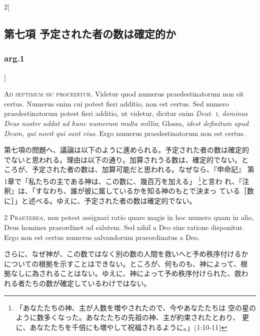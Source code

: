 \documentclass[paper=a4paper,fontsize=10pt,jafontsize=9pt,titlepage]{jlreq}
\begin{document}
\begin{paracol}{2}[\subsection{第七項 予定された者の数は確定的か}\subsubsection{arg.1}]

{\Huge A}{\scshape d septimum sic proceditur}. Videtur quod
numerus praedestinatorum non sit certus. Numerus enim cui potest fieri
additio, non est certus. Sed numero praedestinatorum potest fieri
additio, ut videtur, dicitur enim {\itshape Deut}.~{\scshape i}, {\itshape dominus Deus noster addat ad
hunc numerum multa millia}; Glossa, {\itshape idest definitum apud Deum, qui novit
qui sunt eius}. Ergo numerus praedestinatorum non est certus.


\switchcolumn


第七項の問題へ、議論は以下のように進められる。予定された者の数は確定的
でないと思われる。理由は以下の通り。加算されうる数は、確定的でない。と
ころが、予定された者の数は、加算可能だと思われる。なぜなら、『申命記』
第1章で「私たちの主である神は、この数に、幾百万を加える」
\footnote{「あなたたちの神、主が人数を増やされたので、今やあなたたちは
空の星のように数多くなった。あなたたちの先祖の神、主が約束されたとおり、
更に、あなたたちを千倍にも増やして祝福されるように。」(1:10-11)}と言わ
れ、『注釈』は、「すなわち、誰が彼に属しているかを知る神のもとで決まっ
ている［数に］」と述べる。ゆえに、予定された者の数は確定的でない。




{\scshape 2 Praeterea}, non potest assignari ratio quare
magis in hoc numero quam in alio, Deus homines praeordinet ad
salutem. Sed nihil a Deo sine ratione disponitur. Ergo non est certus
numerus salvandorum praeordinatus a Deo.


\switchcolumn


さらに、なぜ神が、この数ではなく別の数の人間を救いへと予め秩序付けるか
についての根拠を示すことはできない。ところが、何ものも、神によって、根
拠なしに為されることはない。ゆえに、神によって予め秩序付けられた、救わ
れる者たちの数が確定しているわけではない。





\end{paracol}
\end{document}
